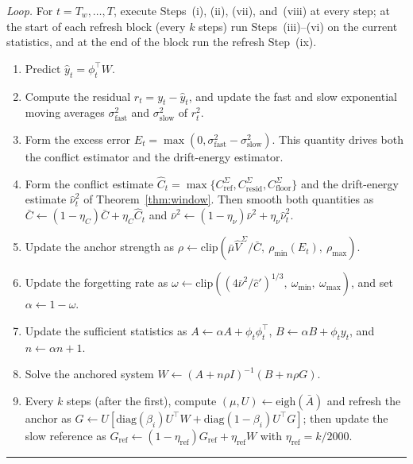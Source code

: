 \documentclass[twoside,11pt]{article}
\begin{document}
\begin{minipage}{\textwidth}
{\emph{Loop.} For $t = T_w,\dots,T$, execute Steps~(i), (ii), (vii), and~(viii) at every step; at the start of each refresh block (every $k$ steps) run Steps~(iii)--(vi) on the current statistics, and at the end of the block run the refresh Step~(ix).
\begin{enumerate}
\renewcommand{\labelenumi}{(\roman{enumi})}
\setlength{\itemsep}{1pt}
\setlength{\parsep}{0pt}
\setlength{\topsep}{2pt}
\setlength{\partopsep}{0pt}
\item Predict $\hat y_t = \phi_t^\top W$.
\item Compute the residual $r_t = y_t - \hat y_t$, and update the fast and slow exponential moving averages $\sigma^2_{\mathrm{fast}}$ and $\sigma^2_{\mathrm{slow}}$ of $r_t^2$.
\item Form the excess error $E_t = \max(0, \sigma^2_{\mathrm{fast}} - \sigma^2_{\mathrm{slow}})$. This quantity drives both the conflict estimator and the drift-energy estimator.
\item Form the conflict estimate $\widehat C_t = \max\{C^\Sigma_{\mathrm{ref}}, C^\Sigma_{\mathrm{resid}}, C^\Sigma_{\mathrm{floor}}\}$ and the drift-energy estimate $\widehat\nu^2_t$ of Theorem~\ref{thm:window}. Then smooth both quantities as $\bar C \leftarrow (1-\eta_C)\bar C + \eta_C\widehat C_t$ and $\bar\nu^2 \leftarrow (1-\eta_\nu)\bar\nu^2 + \eta_\nu\widehat\nu^2_t$.
\item Update the anchor strength as $\rho \leftarrow \mathrm{clip}(\bar\mu\widehat V^\Sigma/\bar C,\ \rho_{\min}(E_t),\ \rho_{\max})$.
\item Update the forgetting rate as $\omega \leftarrow \mathrm{clip}((4\bar\nu^2/\hat c')^{1/3},\ \omega_{\min},\ \omega_{\max})$, and set $\alpha \leftarrow 1-\omega$.
\item Update the sufficient statistics as $A \leftarrow \alpha A + \phi_t\phi_t^\top$, $B \leftarrow \alpha B + \phi_t y_t$, and $n \leftarrow \alpha n + 1$.
\item Solve the anchored system $W \leftarrow (A + n\rho I)^{-1}(B + n\rho G)$.
\item Every $k$ steps (after the first), compute $(\mu,U) \leftarrow \mathrm{eigh}(\bar A)$ and refresh the anchor as $G \leftarrow U[\mathrm{diag}(\beta_i)U^\top W + \mathrm{diag}(1-\beta_i)U^\top G]$; then update the slow reference as $G_{\mathrm{ref}} \leftarrow (1-\eta_{\mathrm{ref}})G_{\mathrm{ref}} + \eta_{\mathrm{ref}} W$ with $\eta_{\mathrm{ref}} = k/2000$.
\end{enumerate}
}
\vspace{2pt}\hrule
\end{minipage}
\end{document}
